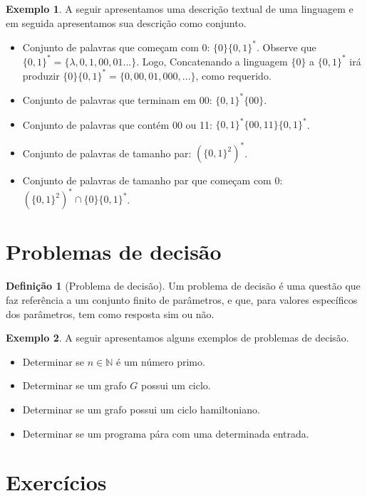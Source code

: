 \documentclass[a4paper]{article}
\theoremstyle{definition}
\newtheorem{Example}{Exemplo}
\newtheorem{Definition}{Definição}
\begin{document}
  \begin{Example}
    A seguir apresentamos uma descrição textual de uma linguagem
    e em seguida apresentamos sua descrição como conjunto.
    \begin{itemize}
      \item Conjunto de palavras que começam com 0: $\{0\}\{0,1\}^*$.
            Observe que $\{0,1\}^*=\{\lambda,0,1,00,01...\}$. Logo,
            Concatenando a linguagem $\{0\}$ a $\{0,1\}^*$ irá produzir
            $\{0\}\{0,1\}^* = \{0,00,01, 000, ...\}$, como requerido.
      \item Conjunto de palavras que terminam em 00: $\{0,1\}^*\{00\}$.
      \item Conjunto de palavras que contém 00 ou 11:
        $\{0,1\}^*\{00,11\}\{0,1\}^*$.
      \item Conjunto de palavras de tamanho par: $(\{0,1\}^2)^*$.
      \item Conjunto de palavras de tamanho par que começam com 0:
            $(\{0,1\}^2)^* \cap \{0\}\{0,1\}^*$.  
    \end{itemize}
  \end{Example}


  \section{Problemas de decisão}

  \begin{Definition}[Problema de decisão]
    Um problema de decisão é uma questão que faz referência a um
    conjunto finito de parâmetros, e que, para valores específicos dos
    parâmetros, tem como resposta sim ou não.
  \end{Definition}

  \begin{Example}
    A seguir apresentamos alguns exemplos de problemas de decisão.
    \begin{itemize}
      \item Determinar se $n \in \mathbb{N}$ é um número primo.
      \item Determinar se um grafo $G$ possui um ciclo.
      \item Determinar se um grafo possui um ciclo hamiltoniano.
      \item Determinar se um programa pára com uma determinada entrada.
    \end{itemize}  
  \end{Example}
  
  \section{Exercícios}
\end{document}

